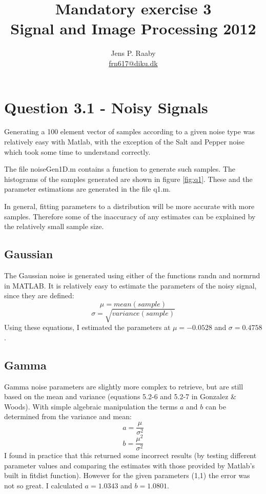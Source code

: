 \documentclass{article}
\title{Mandatory exercise 3 \\
Signal and Image Processing 2012}
\author{Jens P. Raaby \\
\url{frn617@diku.dk}}
\begin{document}
 
\maketitle

\section*{Question 3.1 - Noisy Signals}
Generating a 100 element vector of samples according to a given noise type was relatively easy with Matlab, with the exception of the Salt and Pepper noise which took some time to understand correctly. 

The file noiseGen1D.m contains a function to generate such samples. The histograms of the samples generated are shown in figure \ref{fig:q1}. These and the parameter estimations are generated in the file q1.m.

In general, fitting parameters to a distribution will be more accurate with more samples. Therefore some of the inaccuracy of any estimates can be explained by the relatively small sample size.

\subsection*{Gaussian}
The Gaussian noise is generated using either of the functions randn and normrnd in MATLAB. It is relatively easy to estimate the parameters of the noisy signal, since they are defined:
\[
\mu = mean(sample)
\]
\[
\sigma = \sqrt{variance(sample)}
\]
Using these equations, I estimated the parameters at $\mu = -0.0528$ and $\sigma = 0.4758$.

\subsection*{Gamma}
Gamma noise parameters are slightly more complex to retrieve, but are still based on the mean and variance (equations 5.2-6 and 5.2-7 in Gonzalez \& Woods). With simple algebraic manipulation the terms $a$ and $b$ can be determined from the variance and mean:
\[
a =  \frac {\mu} {\sigma ^2}
\]
\[
b =  \frac { \mu ^2} {\sigma ^2}
\]
I found in practice that this returned some incorrect results (by testing different parameter values and comparing the estimates with those provided by Matlab's built in fitdist function). However for the given parameters (1,1) the error was not so great. I calculated $a=1.0343$ and $b=1.0801$.
\end{document}
